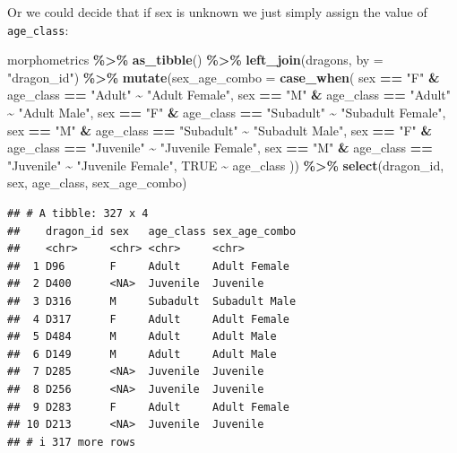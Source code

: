 \documentclass[
]{book}
\newenvironment{Shaded}{\begin{snugshade}}{\end{snugshade}}
\newcommand{\AttributeTok}[1]{\textcolor[rgb]{0.13,0.29,0.53}{#1}}
\newcommand{\ConstantTok}[1]{\textcolor[rgb]{0.56,0.35,0.01}{#1}}
\newcommand{\FunctionTok}[1]{\textcolor[rgb]{0.13,0.29,0.53}{\textbf{#1}}}
\newcommand{\NormalTok}[1]{#1}
\newcommand{\SpecialCharTok}[1]{\textcolor[rgb]{0.81,0.36,0.00}{\textbf{#1}}}
\newcommand{\StringTok}[1]{\textcolor[rgb]{0.31,0.60,0.02}{#1}}
\begin{document}
Or we could decide that if sex is unknown we just simply assign the value of
\texttt{age\_class}:

\begin{Shaded}
\begin{Highlighting}[]
\NormalTok{morphometrics }\SpecialCharTok{\%\textgreater{}\%} 
  \FunctionTok{as\_tibble}\NormalTok{() }\SpecialCharTok{\%\textgreater{}\%} 
  \FunctionTok{left\_join}\NormalTok{(dragons, }\AttributeTok{by =} \StringTok{"dragon\_id"}\NormalTok{) }\SpecialCharTok{\%\textgreater{}\%} 
  \FunctionTok{mutate}\NormalTok{(}\AttributeTok{sex\_age\_combo =} \FunctionTok{case\_when}\NormalTok{(}
\NormalTok{    sex }\SpecialCharTok{==} \StringTok{"F"} \SpecialCharTok{\&}\NormalTok{ age\_class }\SpecialCharTok{==} \StringTok{"Adult"} \SpecialCharTok{\textasciitilde{}} \StringTok{"Adult Female"}\NormalTok{,}
\NormalTok{    sex }\SpecialCharTok{==} \StringTok{"M"} \SpecialCharTok{\&}\NormalTok{ age\_class }\SpecialCharTok{==} \StringTok{"Adult"} \SpecialCharTok{\textasciitilde{}} \StringTok{"Adult Male"}\NormalTok{,}
\NormalTok{    sex }\SpecialCharTok{==} \StringTok{"F"} \SpecialCharTok{\&}\NormalTok{ age\_class }\SpecialCharTok{==} \StringTok{"Subadult"} \SpecialCharTok{\textasciitilde{}} \StringTok{"Subadult Female"}\NormalTok{,}
\NormalTok{    sex }\SpecialCharTok{==} \StringTok{"M"} \SpecialCharTok{\&}\NormalTok{ age\_class }\SpecialCharTok{==} \StringTok{"Subadult"} \SpecialCharTok{\textasciitilde{}} \StringTok{"Subadult Male"}\NormalTok{,}
\NormalTok{    sex }\SpecialCharTok{==} \StringTok{"F"} \SpecialCharTok{\&}\NormalTok{ age\_class }\SpecialCharTok{==} \StringTok{"Juvenile"} \SpecialCharTok{\textasciitilde{}} \StringTok{"Juvenile Female"}\NormalTok{,}
\NormalTok{    sex }\SpecialCharTok{==} \StringTok{"M"} \SpecialCharTok{\&}\NormalTok{ age\_class }\SpecialCharTok{==} \StringTok{"Juvenile"} \SpecialCharTok{\textasciitilde{}} \StringTok{"Juvenile Female"}\NormalTok{,}
    \ConstantTok{TRUE} \SpecialCharTok{\textasciitilde{}}\NormalTok{ age\_class}
\NormalTok{    )) }\SpecialCharTok{\%\textgreater{}\%} 
  \FunctionTok{select}\NormalTok{(dragon\_id, sex, age\_class, sex\_age\_combo)}
\end{Highlighting}
\end{Shaded}

\begin{verbatim}
## # A tibble: 327 x 4
##    dragon_id sex   age_class sex_age_combo
##    <chr>     <chr> <chr>     <chr>        
##  1 D96       F     Adult     Adult Female 
##  2 D400      <NA>  Juvenile  Juvenile     
##  3 D316      M     Subadult  Subadult Male
##  4 D317      F     Adult     Adult Female 
##  5 D484      M     Adult     Adult Male   
##  6 D149      M     Adult     Adult Male   
##  7 D285      <NA>  Juvenile  Juvenile     
##  8 D256      <NA>  Juvenile  Juvenile     
##  9 D283      F     Adult     Adult Female 
## 10 D213      <NA>  Juvenile  Juvenile     
## # i 317 more rows
\end{verbatim}
\end{document}
